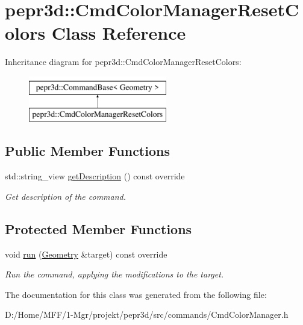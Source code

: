 \hypertarget{classpepr3d_1_1_cmd_color_manager_reset_colors}{}\section{pepr3d\+::Cmd\+Color\+Manager\+Reset\+Colors Class Reference}
\label{classpepr3d_1_1_cmd_color_manager_reset_colors}
Inheritance diagram for pepr3d\+::Cmd\+Color\+Manager\+Reset\+Colors\+:\begin{figure}[H]
\begin{center}
\leavevmode
\includegraphics[height=2.000000cm]{classpepr3d_1_1_cmd_color_manager_reset_colors}
\end{center}
\end{figure}
\subsection*{Public Member Functions}
\begin{DoxyCompactItemize}
\item 
\mbox{\label{classpepr3d_1_1_cmd_color_manager_reset_colors_a79a788c0d947780c54e94ceb0eeafcfb}} 
std\+::string\+\_\+view \mbox{\hyperlink{classpepr3d_1_1_cmd_color_manager_reset_colors_a79a788c0d947780c54e94ceb0eeafcfb}{get\+Description}} () const override
\begin{DoxyCompactList}\small\item\em Get description of the command. \end{DoxyCompactList}\end{DoxyCompactItemize}
\subsection*{Protected Member Functions}
\begin{DoxyCompactItemize}
\item 
\mbox{\label{classpepr3d_1_1_cmd_color_manager_reset_colors_a95da87e8ba7e901470c93b51f199f05a}} 
void \mbox{\hyperlink{classpepr3d_1_1_cmd_color_manager_reset_colors_a95da87e8ba7e901470c93b51f199f05a}{run}} (\mbox{\hyperlink{classpepr3d_1_1_geometry}{Geometry}} \&target) const override
\begin{DoxyCompactList}\small\item\em Run the command, applying the modifications to the target. \end{DoxyCompactList}\end{DoxyCompactItemize}


The documentation for this class was generated from the following file\+:\begin{DoxyCompactItemize}
\item 
D\+:/\+Home/\+M\+F\+F/1-\/\+Mgr/projekt/pepr3d/src/commands/Cmd\+Color\+Manager.\+h\end{DoxyCompactItemize}
